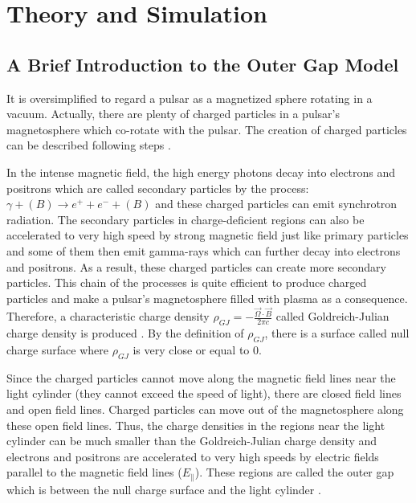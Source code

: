 \documentclass[a4paper, 12pt]{report}
\newcommand{\gj}[0]{
  Goldreich-Julian charge density
}
\begin{document}
    
  
        
\chapter{Theory and Simulation}
  \section{A Brief Introduction to the Outer Gap Model}
    It is oversimplified to regard a pulsar as a magnetized sphere rotating in a vacuum. 
    Actually, there are plenty of charged particles in a pulsar's magnetosphere 
    which co-rotate with the pulsar. The creation of charged particles can 
    be described following steps \citep{Sturrock:1971zc}.

    In the intense magnetic field, the high energy photons decay into electrons and 
    positrons which are called secondary particles by the process: 
    $\gamma + (B) \rightarrow e^++e^-+(B)$ and these charged particles can emit 
    synchrotron radiation. The secondary particles in charge-deficient regions can also 
    be accelerated to very high speed by strong magnetic field just like primary particles 
    and some of them then emit gamma-rays which can further decay into electrons and 
    positrons. As a result, these charged particles can create more secondary particles.
    This chain of the processes is quite efficient to produce charged particles and 
    make a pulsar's magnetosphere filled with plasma as a consequence. Therefore, a 
    characteristic charge density $\rho_{GJ}=-\frac{\vec{\Omega}\cdot \vec{B}}{2\pi c}$ 
    called Goldreich-Julian charge density is produced \citep{1969ApJ}.
    By the definition of $\rho_{GJ}$, there is a surface called null charge surface where 
    $\rho_{GJ}$ is very close or equal to $0$. 

    Since the charged particles cannot move along the magnetic field lines near 
    the light cylinder (they cannot exceed the speed of light), there are closed field 
    lines and open field lines. Charged particles can move out of the magnetosphere along 
    these open field lines. Thus, the charge densities in the regions near the light cylinder
    can be much smaller than the \gj{} and electrons and positrons are accelerated to very high 
    speeds by electric fields parallel to the magnetic field lines ($E_{\parallel}$). 
    These regions are called the outer gap which is between the null charge surface and the 
    light cylinder \citep{1986ApJ...300..500C}.
    
\end{document}
